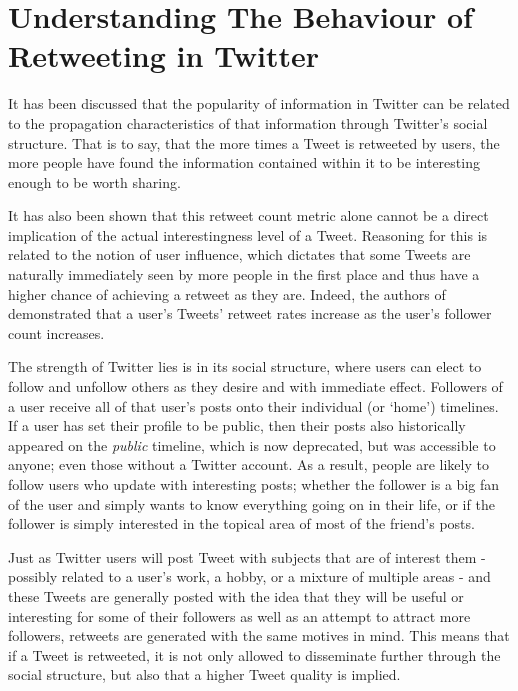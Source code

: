 \chapter{Understanding The Behaviour of Retweeting in Twitter}


It has been discussed that the popularity of information in Twitter can be related to the propagation characteristics of that information through Twitter's social structure. That is to say, that the more times a Tweet is retweeted by users, the more people have found the information contained within it to be interesting enough to be worth sharing.

It has also been shown that this retweet count metric alone cannot be a direct implication of the actual interestingness level of a Tweet. Reasoning for this is related to the notion of user influence, which dictates that some Tweets are naturally immediately seen by more people in the first place and thus have a higher chance of achieving a retweet as they are. Indeed, the authors of \cite{suh10} demonstrated that a user's Tweets' retweet rates increase as the user's follower count increases.

The strength of Twitter lies is in its social structure, where users can elect to follow and unfollow others as they desire and with immediate effect. Followers of a user receive all of that user's posts onto their individual (or `home') timelines. If a user has set their profile to be public, then their posts also historically appeared on the \textit{public} timeline, which is now deprecated, but was accessible to anyone; even those without a Twitter account. As a result, people are likely to follow users who update with interesting posts; whether the follower is a big fan of the user and simply wants to know everything going on in their life, or if the follower is simply interested in the topical area of most of the friend's posts. 

Just as Twitter users will post Tweet with subjects that are of interest them - possibly related to a user's work, a hobby, or a mixture of multiple areas - and these Tweets are generally posted with the idea that they will be useful or interesting for some of their followers as well as an attempt to attract more followers, retweets are generated with the same motives in mind. This means that if a Tweet is retweeted, it is not only allowed to disseminate further through the social structure, but also that a higher Tweet quality is implied.

